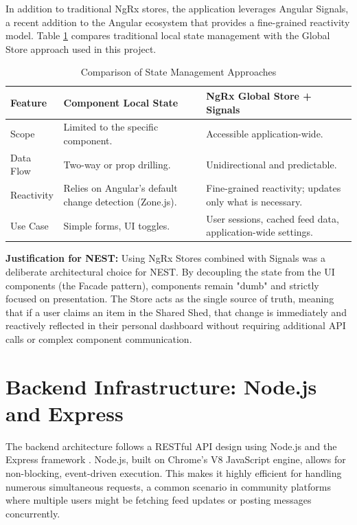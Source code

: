 In addition to traditional NgRx stores, the application leverages Angular Signals, a recent addition to the Angular ecosystem that provides a fine-grained reactivity model. Table \ref{tab:state-management} compares traditional local state management with the Global Store approach used in this project.

\begin{table}[h]
\centering
\begin{tabular}{|l|p{5cm}|p{5cm}|}
\hline
\textbf{Feature} & \textbf{Component Local State} & \textbf{NgRx Global Store + Signals} \\ \hline
Scope & Limited to the specific component. & Accessible application-wide. \\ \hline
Data Flow & Two-way or prop drilling. & Unidirectional and predictable. \\ \hline
Reactivity & Relies on Angular's default change detection (Zone.js). & Fine-grained reactivity; updates only what is necessary. \\ \hline
Use Case & Simple forms, UI toggles. & User sessions, cached feed data, application-wide settings. \\ \hline
\end{tabular}
\caption{Comparison of State Management Approaches}
\label{tab:state-management}
\end{table}

\textbf{Justification for NEST:} Using NgRx Stores combined with Signals was a deliberate architectural choice for NEST. By decoupling the state from the UI components (the Facade pattern), components remain "dumb" and strictly focused on presentation. The Store acts as the single source of truth, meaning that if a user claims an item in the Shared Shed, that change is immediately and reactively reflected in their personal dashboard without requiring additional API calls or complex component communication.

\section{Backend Infrastructure: Node.js and Express}
The backend architecture follows a RESTful API design using Node.js and the Express framework \cite{expressDocs}. Node.js, built on Chrome's V8 JavaScript engine, allows for non-blocking, event-driven execution. This makes it highly efficient for handling numerous simultaneous requests, a common scenario in community platforms where multiple users might be fetching feed updates or posting messages concurrently.

